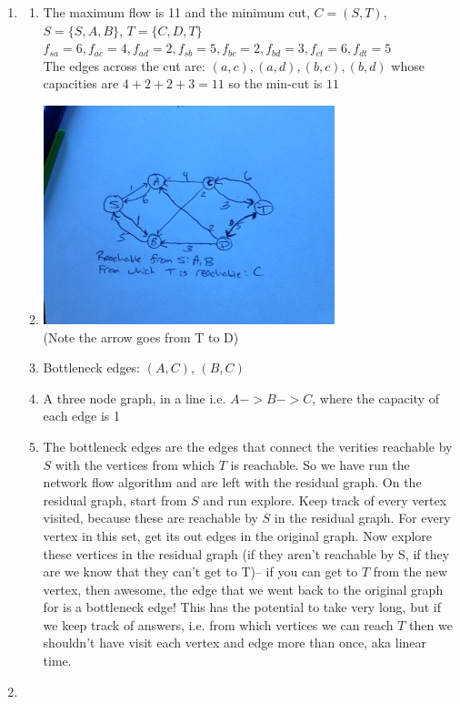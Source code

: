 \documentclass[11pt]{article}
\begin{document}
\begin{enumerate}
\begin{enumerate}
\end{enumerate}
\newpage
\item
\begin{enumerate}
\item The maximum flow is 11 and the minimum cut, $C=(S,T)$, $S=\{S,A,B\}$, $T=\{C,D,T\}$\\
$f_{sa}=6, f_{ac}=4, f_{ad}=2, f_{sb}=5, f_{bc}=2, f_{bd}=3, f_{ct}=6, f_{dt}=5$\\
The edges across the cut are: $(a,c), (a,d), (b,c), (b,d)$ whose capacities are $4+2+2+3=11$ so the min-cut is $11$
\item \includegraphics{photo.jpeg} \\(Note the arrow goes from T to D)
\item Bottleneck edges: $(A,C)$, $(B,C)$
\item A three node graph, in a line i.e. $A->B->C$, where the capacity of each edge is 1
\item The bottleneck edges are the edges that connect the verities reachable by $S$ with the vertices from which $T$ is reachable. So we have run the network flow algorithm and are left with the residual graph. On the residual graph, start from $S$ and run explore. Keep track of every vertex visited, because these are reachable by $S$ in the residual graph. For every vertex in this set, get its out edges in the original graph. Now explore these vertices in the residual graph (if they aren't reachable by S, if they are we know that they can't get to T)-- if you can get to $T$ from the new vertex, then awesome, the edge that we went back to the original graph for is a bottleneck edge! This has the potential to take very long, but if we keep track of answers, i.e. from which vertices we can reach $T$ then we shouldn't have visit each vertex and edge more than once, aka linear time.
\end{enumerate}
\newpage
\item

\end{enumerate}
\end{document}
